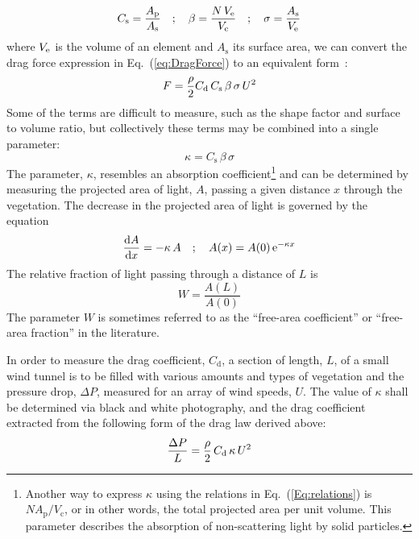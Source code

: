 \documentclass[12pt]{article}
\begin{document}
\begin{equation}
   C_{\rm s} = \frac{A_{\mathrm{p}}}{A_{\mathrm{s}}} \quad ; \quad  \beta=\frac{N \, V_{\rm e}}{V_{\mathrm{c}}}  \quad ; \quad \sigma=\frac{A_{\rm s}}{V_{\rm e}} \label{Eq:relations}
\end{equation}
where $V_{\rm e}$ is the volume of an element and $A_{\mathrm{s}}$ its surface area, we can convert the drag force expression in Eq.~(\ref{eq:DragForce}) to an equivalent form~\cite{Mueller2014}:
\begin{equation}
\label{eq:DragForcea}
F  = \frac{\rho}{2} C_{\rm d} \, C_{\mathrm{s}} \, \beta \, \sigma \, U^2
\end{equation}
Some of the terms are difficult to measure, such as the shape factor and surface to volume ratio, but collectively these terms may be combined into a single parameter:
\begin{equation}
\label{eq:Kappa}
\kappa = C_{\mathrm{s}} \, \beta \, \sigma
\end{equation}
The parameter, $\kappa$, resembles an absorption coefficient\footnote{Another way to express $\kappa$ using the relations in Eq.~(\ref{Eq:relations}) is $N A_{\mathrm{p}}/V_{\mathrm{c}}$, or in other words, the total projected area per unit volume. This parameter describes the absorption of non-scattering light by solid particles.} and can be determined by measuring the projected area of light, $A$, passing a given distance $x$ through the vegetation. The decrease in the projected area of light is governed by the equation
\begin{equation}
   \frac{ \mathrm{d}A}{\mathrm{d} x} = -\kappa \, A  \quad ; \quad  A(x) = A(0) \, {\rm e}^{-\kappa x}
\end{equation}
The relative fraction of light passing through a distance of $L$ is
\begin{equation}\label{eq:WhiteFraction}
W = \frac{A(L)}{A(0)}
\end{equation}
The parameter $W$ is sometimes referred to as the ``free-area coefficient'' or ``free-area fraction'' in the literature.

In order to measure the drag coefficient, $C_{\mathrm{d}}$, a section of length, $L$, of a small wind tunnel is to be filled with various amounts and types of vegetation and the pressure drop, $\Delta P$, measured for an array of wind speeds, $U$. The value of $\kappa$ shall be determined via black and white photography, and the drag coefficient extracted from the following form of the drag law derived above:
\begin{equation}\label{eq:Pressure}
\frac{\Delta P}{L}  = \frac{\rho}{2} \, C_{\rm d} \, \kappa \, U^2
\end{equation}
\pagebreak
\end{document}
